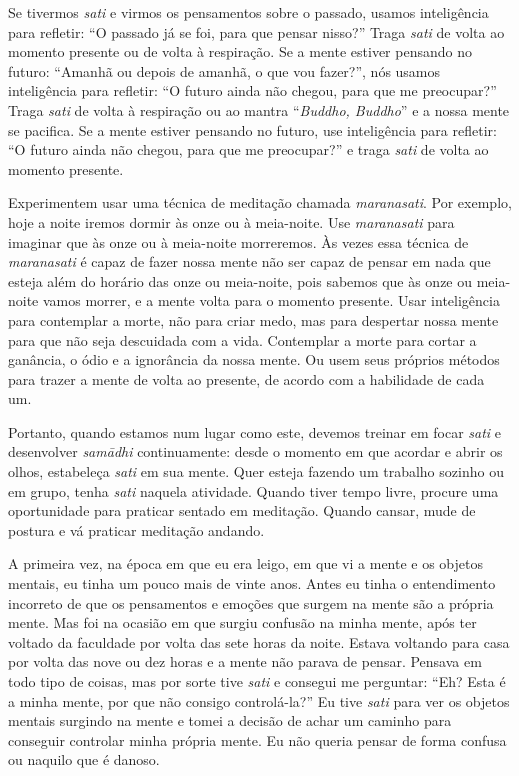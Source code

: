 Se tivermos \textit{sati }e virmos os pensamentos sobre o passado,
usamos inteligência para refletir: “O passado já se foi, para que
pensar nisso?” Traga \textit{sati }de volta ao momento presente ou de
volta à respiração. Se a mente estiver pensando no futuro: “Amanhã ou
depois de amanhã, o que vou fazer?”, nós usamos inteligência para
refletir: “O futuro ainda não chegou, para que me preocupar?” Traga
\textit{sati }de volta à respiração ou ao mantra “\textit{Buddho,
Buddho}” e a nossa mente se pacifica. Se a mente estiver pensando no
futuro, use inteligência para refletir: “O futuro ainda não chegou,
para que me preocupar?” e traga \textit{sati }de volta ao momento
presente.

Experimentem usar uma técnica de meditação chamada
\textit{maranasati}. Por exemplo, hoje a noite iremos dormir às onze ou
à meia-noite. Use \textit{maranasati }para imaginar que às onze ou à
meia-noite morreremos. Às vezes essa técnica de \textit{maranasati }é
capaz de fazer nossa mente não ser capaz de pensar em nada que esteja
além do horário das onze ou meia-noite, pois sabemos que às onze ou
meia-noite vamos morrer, e a mente volta para o momento presente. Usar
inteligência para contemplar a morte, não para criar medo, mas para
despertar nossa mente para que não seja descuidada com a vida.
Contemplar a morte para cortar a ganância, o ódio e a ignorância da
nossa mente. Ou usem seus próprios métodos para trazer a mente de volta
ao presente, de acordo com a habilidade de cada um.

Portanto, quando estamos num lugar como este, devemos treinar em
focar \textit{sati }e desenvolver \textit{sam\=adhi }continuamente:
desde o momento em que acordar e abrir os olhos, estabeleça
\textit{sati }em sua mente. Quer esteja fazendo um trabalho sozinho ou
em grupo, tenha \textit{sati }naquela atividade. Quando tiver tempo
livre, procure uma oportunidade para praticar sentado em meditação.
Quando cansar, mude de postura e vá praticar meditação andando. 

A primeira vez, na época em que eu era leigo, em que vi a mente e os
objetos mentais, eu tinha um pouco mais de vinte anos. Antes eu tinha o
entendimento incorreto de que os pensamentos e emoções que surgem na
mente são a própria mente. Mas foi na ocasião em que surgiu confusão na
minha mente, após ter voltado da faculdade por volta das sete horas da
noite. Estava voltando para casa por volta das nove ou dez horas e a
mente não parava de pensar. Pensava em todo tipo de coisas, mas por
sorte tive \textit{sati }e consegui me perguntar: “Eh? Esta é a minha
mente, por que não consigo controlá-la?” Eu tive \textit{sati }para ver
os objetos mentais surgindo na mente e tomei a decisão de achar um
caminho para conseguir controlar minha própria mente. Eu não queria
pensar de forma confusa ou naquilo que é danoso.


